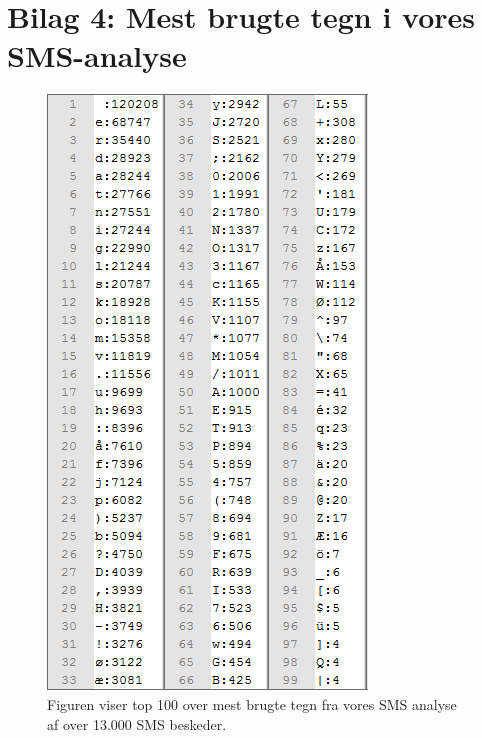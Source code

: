 \section*{Bilag 4: Mest brugte tegn i vores SMS-analyse}
\begin{figure}[H]
\centering
\includegraphics []{Billeder/SMSbilag.png}
\caption {Figuren viser top 100 over mest brugte tegn fra vores SMS analyse af over 13.000 SMS beskeder.}
\label {SMSanalyse}
\end{figure}

